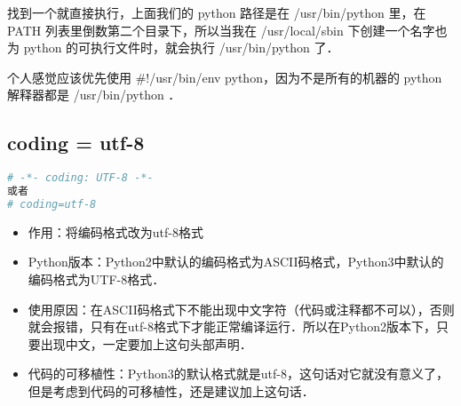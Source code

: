 找到一个就直接执行，上面我们的 python 路径是在 /usr/bin/python 里，在 PATH 列表里倒数第二个目录下，所以当我在 /usr/local/sbin 下创建一个名字也为 python 的可执行文件时，就会执行 /usr/bin/python 了．

个人感觉应该优先使用 #!/usr/bin/env python，因为不是所有的机器的 python 解释器都是 /usr/bin/python ．

\subsection{coding = utf-8 }
\begin{lstlisting}[language=python]
# -*- coding: UTF-8 -*-
或者
# coding=utf-8
\end{lstlisting}
\begin{itemize}
\item 作用：将编码格式改为utf-8格式
\item Python版本：Python2中默认的编码格式为ASCII码格式，Python3中默认的编码格式为UTF-8格式．
\item 使用原因：在ASCII码格式下不能出现中文字符（代码或注释都不可以），否则就会报错，只有在utf-8格式下才能正常编译运行．所以在Python2版本下，只要出现中文，一定要加上这句头部声明．
\item 代码的可移植性：Python3的默认格式就是utf-8，这句话对它就没有意义了，但是考虑到代码的可移植性，还是建议加上这句话．
\end{itemize}

